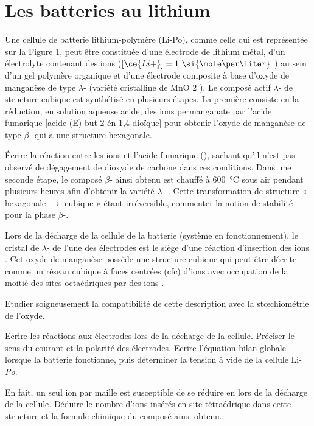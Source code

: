 \section{Les batteries au lithium}

\setcounter{equation}{0}
\setcounter{Q}{0}

Une cellule de batterie lithium-polymère (Li-Po), comme celle qui est représentée sur la Figure 1, peut être constituée d’une électrode de lithium métal, d’un électrolyte contenant des ions  ($[\ce{Li+}] = 1 ~ \si{\mole\per\liter}$ ) au sein d’un gel polymère organique et d’une électrode composite à base d’oxyde de manganèse de type $\lambda$- (variété cristalline de MnO 2 ). Le composé actif $\lambda$- de structure cubique est synthétisé en plusieurs étapes. La première consiste en la réduction, en solution aqueuse acide, des ions permanganate par l’acide fumarique [acide (E)-but-2-én-1,4-dioïque] pour obtenir l’oxyde de manganèse de type $\beta$- qui a une structure hexagonale.

\Q \'{E}crire la réaction entre les ions  et l’acide fumarique (), sachant qu’il n’est pas observé de dégagement de dioxyde de carbone dans ces conditions. Dans une seconde étape, le composé $\beta$- ainsi obtenu est chauffé à \SI{600}{\celsius} sous air pendant plusieurs heures afin d’obtenir la variété $\lambda$- . Cette transformation de structure « hexagonale $\to$ cubique » étant irréversible, commenter la notion de stabilité pour la phase $\beta$-.

Lors de la décharge de la cellule de la batterie (système en fonctionnement), le cristal de $\lambda$- de l’une des électrodes est le siège d’une réaction d’insertion des ions . Cet oxyde de manganèse possède une structure cubique qui peut être décrite comme un réseau cubique à faces centrées (cfc) d’ions  avec occupation de la moitié des sites octaédriques par des ions  .

\Q Etudier soigneusement la compatibilité de cette description avec la stœchiométrie de l’oxyde.

\Q Ecrire les réactions aux électrodes lors de la décharge de la cellule. Préciser le sens du courant et la polarité des électrodes. Ecrire l’équation-bilan globale lorsque la batterie fonctionne, puis déterminer la tension à vide de la cellule Li-\emph{Po}.

\Q En fait, un seul ion  par maille est susceptible de se réduire en  lors de la décharge de la cellule. Déduire le nombre d’ions  insérés en site tétraédrique dans cette structure et la formule chimique du composé ainsi obtenu.

